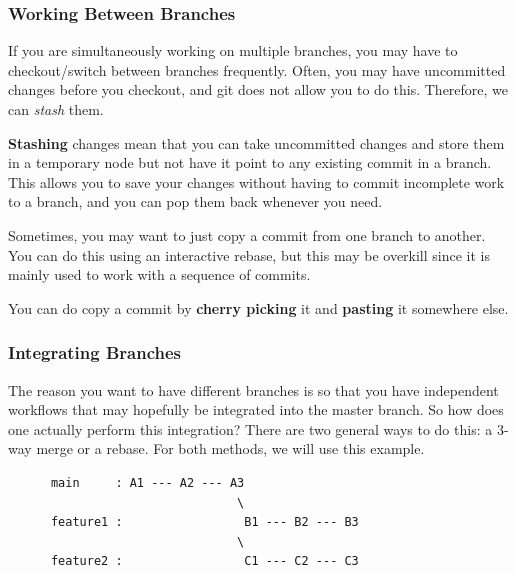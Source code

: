   \subsubsection{Working Between Branches} 

    If you are simultaneously working on multiple branches, you may have to checkout/switch between branches frequently. Often, you may have uncommitted changes before you checkout, and git does not allow you to do this. Therefore, we can \textit{stash} them. 

    \begin{definition}[Stash]
      \label{def:stash}
      \textbf{Stashing} changes mean that you can take uncommitted changes and store them in a temporary node but not have it point to any existing commit in a branch. This allows you to save your changes without having to commit incomplete work to a branch, and you can pop them back whenever you need. 
    \end{definition} 

    Sometimes, you may want to just copy a commit from one branch to another. You can do this using an interactive rebase, but this may be overkill since it is mainly used to work with a sequence of commits. 

    \begin{definition}
      \label{def:cherry-picking-and-pasting}
      You can do copy a commit by \textbf{cherry picking} it and \textbf{pasting} it somewhere else. 
    \end{definition} 

  \subsubsection{Integrating Branches} 

    The reason you want to have different branches is so that you have independent workflows that may hopefully be integrated into the master branch. So how does one actually perform this integration? There are two general ways to do this: a 3-way merge or a rebase. For both methods, we will use this example. 
    \begin{lstlisting}
      main     : A1 --- A2 --- A3
                                \
      feature1 :                 B1 --- B2 --- B3
                                \
      feature2 :                 C1 --- C2 --- C3
    \end{lstlisting}

